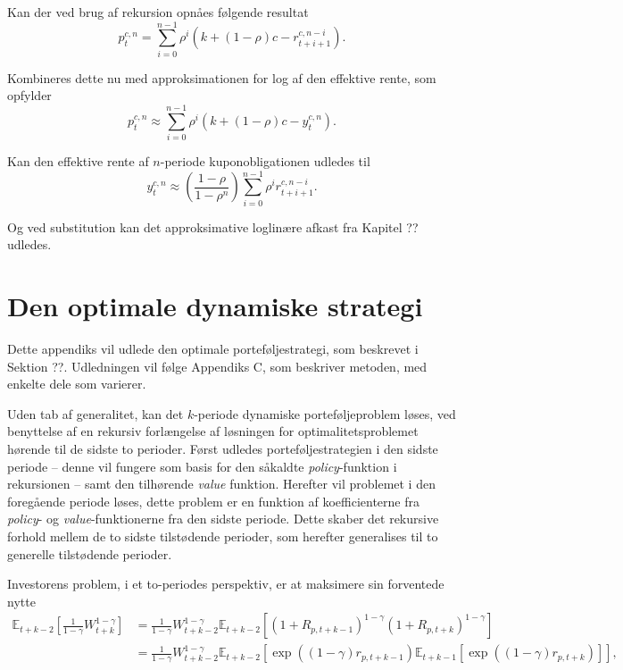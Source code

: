 \documentclass[
  a4paper,
  oneside]{memoir}
\begin{document}
Kan der ved brug af rekursion opnåes følgende resultat
\begin{equation}
p_t^{c,n}=\sum_{i=0}^{n-1} \rho^i(k+(1-\rho)c - r_{t+i+1}^{c,n-i}).
\end{equation}

Kombineres dette nu med approksimationen for log af den effektive rente, som opfylder
\begin{equation}
p_t^{c,n}\approx\sum_{i=0}^{n-1} \rho^i(k+(1-\rho)c - y_t^{c,n}).
\end{equation}

Kan den effektive rente af \(n\)-periode kuponobligationen udledes til
\begin{equation}
y_t^{c,n}\approx (\frac{1-\rho}{1-\rho^n})\sum_{i=0}^{n-1}\rho^i r_{t+i+1}^{c,n-i}.
\end{equation}

Og ved substitution kan det approksimative loglinære afkast fra Kapitel ?? udledes.

\hypertarget{optdynstrategi}{%
\chapter{Den optimale dynamiske strategi}\label{optdynstrategi}}

Dette appendiks vil udlede den optimale porteføljestrategi, som beskrevet i Sektion ??. Udledningen vil følge \citep{JurVic2011} Appendiks C, som beskriver metoden, med enkelte dele som varierer.

Uden tab af generalitet, kan det \(k\)-periode dynamiske porteføljeproblem løses, ved benyttelse af en rekursiv forlængelse af løsningen for optimalitetsproblemet hørende til de sidste to perioder. Først udledes porteføljestrategien i den sidste periode -- denne vil fungere som basis for den såkaldte \emph{policy}-funktion i rekursionen -- samt den tilhørende \emph{value} funktion. Herefter vil problemet i den foregående periode løses, dette problem er en funktion af koefficienterne fra \emph{policy}- og \emph{value}-funktionerne fra den sidste periode. Dette skaber det rekursive forhold mellem de to sidste tilstødende perioder, som herefter generalises til to generelle tilstødende perioder.

Investorens problem, i et to-periodes perspektiv, er at maksimere sin forventede nytte
\begin{align*}
\mathbb{E}_{t+k-2}\left[\frac{1}{1-\gamma} W_{t+k}^{1-\gamma}\right]&=\frac{1}{1-\gamma} W_{t+k-2}^{1-\gamma} \mathbb{E}_{t+k-2}\left[(1+R_{p,t+k-1})^{1-\gamma}(1+R_{p,t+k})^{1-\gamma}\right]\\
&=\frac{1}{1-\gamma} W_{t+k-2}^{1-\gamma} \mathbb{E}_{t+k-2}\left[\exp((1-\gamma) r_{p,t+k-1}) \mathbb{E}_{t+k-1}\left[\exp((1-\gamma)r_{p,t+k})\right]\right],
\end{align*}
\end{document}
